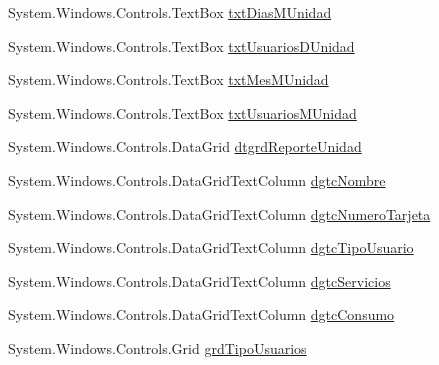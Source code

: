 \begin{DoxyCompactItemize}
\item 
System.\-Windows.\-Controls.\-Text\-Box \hyperlink{class_proyecto___integrador__3_1_1_reportes_1_1_reporte_frecuencia_de_uso_ac57af5c45eb5829244bdb033e19a7ea8}{txt\-Dias\-M\-Unidad}
\item 
System.\-Windows.\-Controls.\-Text\-Box \hyperlink{class_proyecto___integrador__3_1_1_reportes_1_1_reporte_frecuencia_de_uso_a0b2b2103ff7f1f55f8698b23e1672dbe}{txt\-Usuarios\-D\-Unidad}
\item 
System.\-Windows.\-Controls.\-Text\-Box \hyperlink{class_proyecto___integrador__3_1_1_reportes_1_1_reporte_frecuencia_de_uso_ae9d8312f5f3d8cef187f25210a97ad43}{txt\-Mes\-M\-Unidad}
\item 
System.\-Windows.\-Controls.\-Text\-Box \hyperlink{class_proyecto___integrador__3_1_1_reportes_1_1_reporte_frecuencia_de_uso_a94304e1e8d7eae9ba6aad17385c65664}{txt\-Usuarios\-M\-Unidad}
\item 
System.\-Windows.\-Controls.\-Data\-Grid \hyperlink{class_proyecto___integrador__3_1_1_reportes_1_1_reporte_frecuencia_de_uso_a76928c8b382b0997a3e7a9f57369c6c0}{dtgrd\-Reporte\-Unidad}
\item 
System.\-Windows.\-Controls.\-Data\-Grid\-Text\-Column \hyperlink{class_proyecto___integrador__3_1_1_reportes_1_1_reporte_frecuencia_de_uso_ae9f936afc28740aa73600b6ebd3bb07c}{dgtc\-Nombre}
\item 
System.\-Windows.\-Controls.\-Data\-Grid\-Text\-Column \hyperlink{class_proyecto___integrador__3_1_1_reportes_1_1_reporte_frecuencia_de_uso_a3c20691f91322ac840de110154029356}{dgtc\-Numero\-Tarjeta}
\item 
System.\-Windows.\-Controls.\-Data\-Grid\-Text\-Column \hyperlink{class_proyecto___integrador__3_1_1_reportes_1_1_reporte_frecuencia_de_uso_a62c05d7f22acb7b7a12bc1e8777906cc}{dgtc\-Tipo\-Usuario}
\item 
System.\-Windows.\-Controls.\-Data\-Grid\-Text\-Column \hyperlink{class_proyecto___integrador__3_1_1_reportes_1_1_reporte_frecuencia_de_uso_ace0842b0e456ad2ad1cf360884b6c699}{dgtc\-Servicios}
\item 
System.\-Windows.\-Controls.\-Data\-Grid\-Text\-Column \hyperlink{class_proyecto___integrador__3_1_1_reportes_1_1_reporte_frecuencia_de_uso_af2b92d2a2c7a62227fa89dc9bf22009b}{dgtc\-Consumo}
\item 
System.\-Windows.\-Controls.\-Grid \hyperlink{class_proyecto___integrador__3_1_1_reportes_1_1_reporte_frecuencia_de_uso_a07daaedf61ed6ed6d9b36a92b037dd53}{grd\-Tipo\-Usuarios}
\item 

\end{DoxyCompactItemize}
